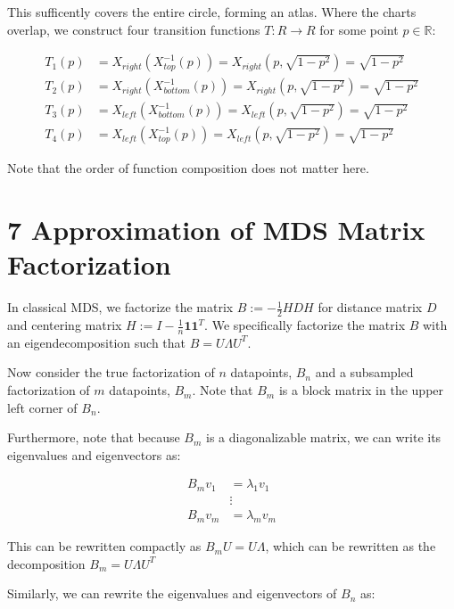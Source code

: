 \documentclass{article}
\begin{document}
        This sufficently covers the entire circle, forming an atlas. Where the charts overlap, we construct four transition functions $T: R \rightarrow R$ for some point $p \in \mathbb{R}$:

        \begin{align*}
            T_1(p) &= X_{right} (X_{top}^{-1}(p)) = X_{right} (p, \sqrt{1 - p^2}) =  \sqrt{1 - p^2} \\
            T_2(p) &= X_{right} (X_{bottom}^{-1}(p)) = X_{right} (p, \sqrt{1 - p^2}) =  \sqrt{1 - p^2} \\
            T_3(p) &= X_{left} (X_{bottom}^{-1}(p)) = X_{left}(p, \sqrt{1 - p^2}) = \sqrt{1 - p^2} \\
            T_4(p) &= X_{left} (X_{top}^{-1}(p)) = X_{left}(p, \sqrt{1 - p^2}) = \sqrt{1 - p^2}
        \end{align*}

        Note that the order of function composition does not matter here.

\section*{7 Approximation of MDS Matrix Factorization}

        In classical MDS, we factorize the matrix $B := -\frac{1}{2} H D H$ for distance matrix $D$ and centering matrix $H := I - \frac{1}{n} \boldsymbol{1} \boldsymbol{1}^T$. We specifically factorize the matrix $B$ with an eigendecomposition such that $B = U \Lambda U^T$.

        Now consider the true factorization of $n$ datapoints, $B_n$ and a subsampled factorization of $m$ datapoints, $B_m$. Note that $B_m$ is a block matrix in the upper left corner of $B_n$.

        Furthermore, note that because $B_m$ is a diagonalizable matrix, we can write its eigenvalues and eigenvectors as:

        \begin{align*}
            B_m v_1 &= \lambda_1 v_1 \\
            & \vdots \\
            B_m v_m &= \lambda_m v_m 
        \end{align*}

        This can be rewritten compactly as $B_m U = U \Lambda$, which can be rewritten as the decomposition $B_m = U \Lambda U^T$

        Similarly, we can rewrite the eigenvalues and eigenvectors of $B_n$ as:
\end{document}
